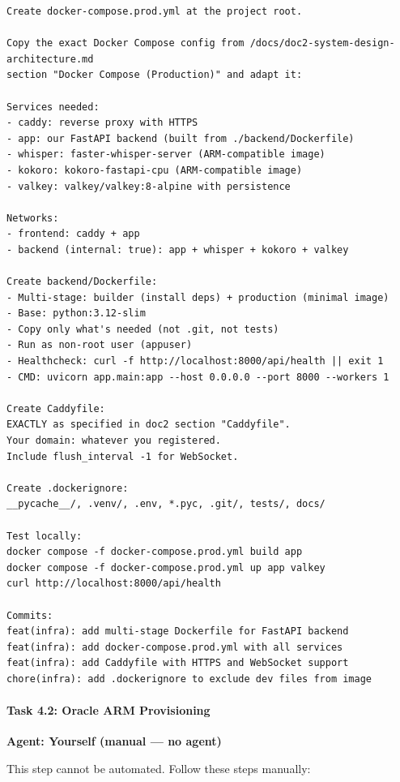 \documentclass[
  11pt,
]{article}
\begin{document}
\begin{lstlisting}
Create docker-compose.prod.yml at the project root.

Copy the exact Docker Compose config from /docs/doc2-system-design-architecture.md
section "Docker Compose (Production)" and adapt it:

Services needed:
- caddy: reverse proxy with HTTPS
- app: our FastAPI backend (built from ./backend/Dockerfile)
- whisper: faster-whisper-server (ARM-compatible image)
- kokoro: kokoro-fastapi-cpu (ARM-compatible image)
- valkey: valkey/valkey:8-alpine with persistence

Networks:
- frontend: caddy + app
- backend (internal: true): app + whisper + kokoro + valkey

Create backend/Dockerfile:
- Multi-stage: builder (install deps) + production (minimal image)
- Base: python:3.12-slim
- Copy only what's needed (not .git, not tests)
- Run as non-root user (appuser)
- Healthcheck: curl -f http://localhost:8000/api/health || exit 1
- CMD: uvicorn app.main:app --host 0.0.0.0 --port 8000 --workers 1

Create Caddyfile:
EXACTLY as specified in doc2 section "Caddyfile".
Your domain: whatever you registered.
Include flush_interval -1 for WebSocket.

Create .dockerignore:
__pycache__/, .venv/, .env, *.pyc, .git/, tests/, docs/

Test locally:
docker compose -f docker-compose.prod.yml build app
docker compose -f docker-compose.prod.yml up app valkey
curl http://localhost:8000/api/health

Commits:
feat(infra): add multi-stage Dockerfile for FastAPI backend
feat(infra): add docker-compose.prod.yml with all services
feat(infra): add Caddyfile with HTTPS and WebSocket support
chore(infra): add .dockerignore to exclude dev files from image
\end{lstlisting}

\hypertarget{task-4.2-oracle-arm-provisioning}{%
\paragraph{Task 4.2: Oracle ARM
Provisioning}\label{task-4.2-oracle-arm-provisioning}}

\textbf{Agent: Yourself (manual --- no agent)}

This step cannot be automated. Follow these steps manually:
\end{document}
